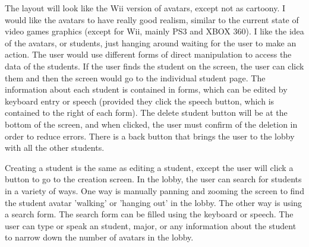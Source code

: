 \documentclass{article}
\begin{document}
The layout will look like the Wii version of avatars, except not as cartoony.  I would like the avatars to have really good realism, similar to the current state of video games graphics (except for Wii, mainly PS3 and XBOX 360).  I like the idea of the avatars, or students, just hanging around waiting for the user to make an action.  The user would use different forms of direct manipulation to access the data of the students.  If the user finds the student on the screen, the user can click them and then the screen would go to the individual student page.  The information about each student is contained in forms, which can be edited by keyboard entry or speech (provided they click the speech button, which is contained to the right of each form).  The delete student button will be at the bottom of the screen, and when clicked, the user must confirm of the deletion in order to reduce errors.  There is a back button that brings the user to the lobby with all the other students. 

Creating a student is the same as editing a student, except the user will click a button to go to the creation screen.  In the lobby, the user can search for students in a variety of ways.  One way is manually panning and zooming the screen to find the student avatar 'walking' or 'hanging out' in the lobby.  The other way is using a search form.  The search form can be filled using the keyboard or speech.  The user can type or speak an student, major, or any information about the student to narrow down the number of avatars in the lobby.



\end{document}

